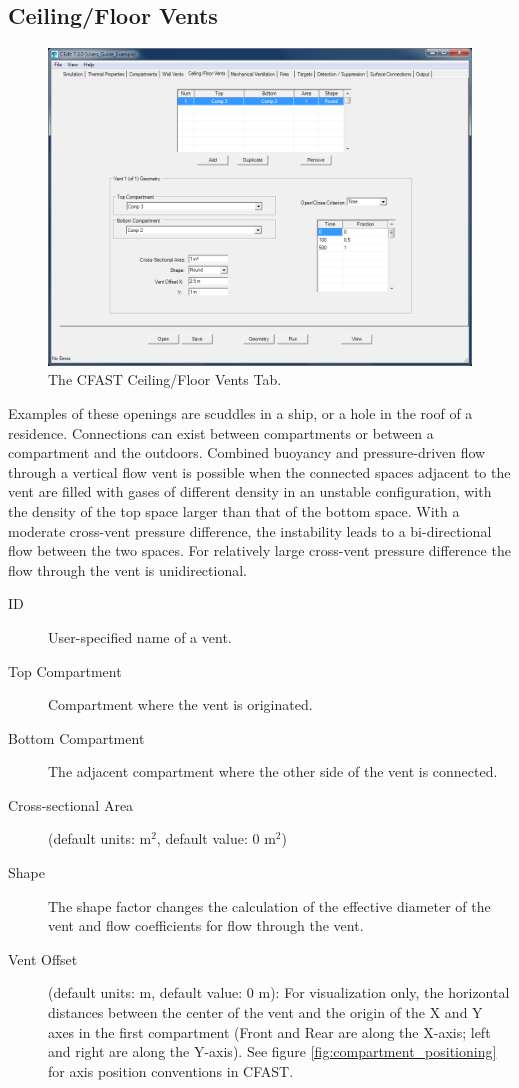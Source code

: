 \subsection{Ceiling/Floor Vents}
\label{info:VENT2}
\begin{figure}[h!]
\includegraphics[width=6.5in]{FIGURES/Vertical_Flow_Tab}
\caption[The CFAST Ceiling/Floor Vents Tab]{The CFAST Ceiling/Floor Vents Tab.}
\end{figure}

Examples of these openings are scuddles in a ship, or a hole in the roof of a residence. Connections can exist between compartments or between a compartment and the outdoors. Combined buoyancy and pressure-driven flow through a vertical flow vent is possible when the connected spaces adjacent to the vent are filled with gases of different density in an unstable configuration, with the density of the top space larger than that of the bottom space. With a moderate cross-vent pressure difference, the instability leads to a bi-directional flow between the two spaces. For relatively large cross-vent pressure difference the flow through the vent is unidirectional.

\begin{description}
\item[ID] User-specified name of a vent.
\item[Top Compartment] Compartment where the vent is originated.
\item[Bottom Compartment] The adjacent compartment where the other side of the vent is connected.
\label{Ceil Cross-sectional Area}
\item[Cross-sectional Area] (default units: m$^2$, default value: 0 m$^2$)
\label{Ceil Shape}
\item[Shape] The shape factor changes the calculation of the effective diameter of the vent and flow coefficients for flow through the vent.
\item[Vent Offset] (default units: m, default value: 0 m): For visualization only, the horizontal distances between the center of the vent and the origin of the X and Y axes in the first compartment (Front and Rear are along the X-axis; left and right are along the Y-axis). See figure \ref{fig:compartment_positioning} for axis position conventions in CFAST.
\end{description}

